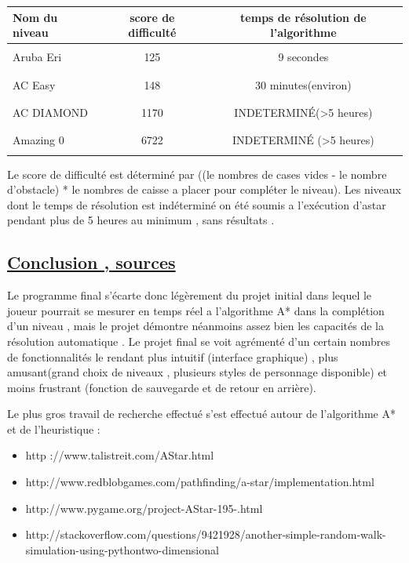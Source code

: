 \documentclass{article}
\begin{document}
\begin{tabular}{|l || c | c |}
\hline
  Nom du niveau & score de difficulté & temps de résolution de l'algorithme \\
 \hline
 \hline
 & &\\
 Aruba Eri & 125 & 9 secondes  \\
  & &\\
  \hline
  & &\\
 AC Easy& 148 & 30 minutes(environ) \\
  & &\\
  \hline
  & &\\
 AC DIAMOND& 1170 & INDETERMINÉ(>5 heures) \\
  & &\\
  \hline
  & &\\
 Amazing 0& 6722 & INDETERMINÉ (>5 heures)\\
  & &\\
 \hline
 \end{tabular}
\vspace{1cm}



Le score de difficulté est déterminé par ((le nombres de cases vides - le nombre d'obstacle) * le nombres de caisse a placer pour compléter le niveau). Les niveaux dont le temps de résolution est indéterminé on été soumis a l'exécution d'astar pendant plus de 5 heures au minimum , sans résultats .
\newpage
 
 
\begin{center}
\section{\underline{Conclusion , sources}}
\end{center}

\vspace{1cm}
Le programme final s'écarte donc légèrement du projet initial dans lequel le joueur pourrait se mesurer en temps réel a l'algorithme A* dans la complétion d'un niveau , mais le projet démontre néanmoins assez bien les capacités de la résolution automatique .
\newline
 Le projet final se voit agrémenté d'un certain nombres de fonctionnalités le rendant plus intuitif (interface graphique) , plus amusant(grand choix de niveaux , plusieurs styles de personnage disponible) et moins frustrant (fonction de sauvegarde et de retour en arrière).

\vspace{2 cm}
Le plus gros travail de recherche effectué s'est effectué autour de l'algorithme A* et de l'heuristique :
\newline 
\begin{itemize}
\item http ://www.talistreit.com/AStar.html
\item http://www.redblobgames.com/pathfinding/a-star/implementation.html
\item http://www.pygame.org/project-AStar-195-.html
\item http://stackoverflow.com/questions/9421928/another-simple-random-walk-simulation-using-pythontwo-dimensional
\end{itemize}
\end{document}
